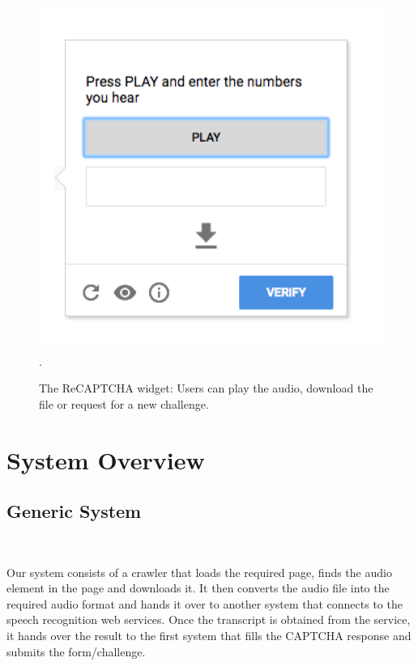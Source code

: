 \begin{figure}[t]
   \centering
   \includegraphics[width=\columnwidth]{figures/Picture1.png}.
   \caption{The ReCAPTCHA widget: Users can play the audio, download the file or request for a new challenge.}
   \label{fig:recaptcha}
\end{figure}

\section{System Overview}
\label{sec:design}

\subsection{Generic System}\mbox{} \
\label{sec:generic}

Our system consists of a crawler that loads the required page, finds the audio element in the page and downloads it. It then converts the audio file into the required audio format and hands it over to another system that connects to the speech recognition web services. Once the transcript is obtained from the service, it hands over the result to the first system that fills the CAPTCHA response and submits the form/challenge.\newline

